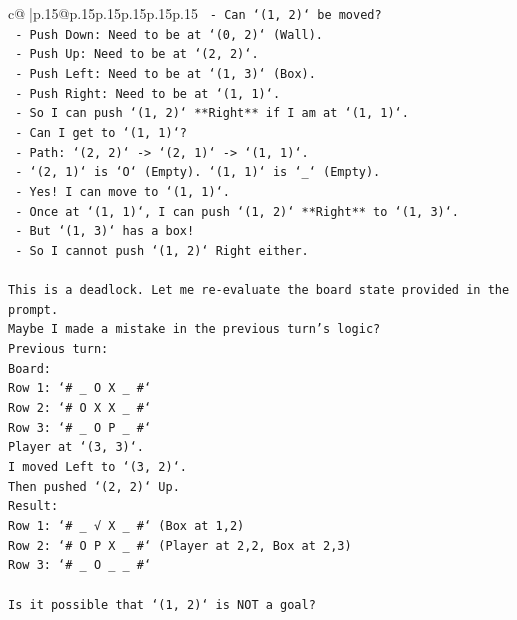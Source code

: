 \documentclass{article}
\begin{document}
{\begin{supertabular}{c@{$\;$}|p{.15\linewidth}@{}p{.15\linewidth}p{.15\linewidth}p{.15\linewidth}p{.15\linewidth}p{.15\linewidth}}
{{{\texttt{  {-} Can `(1, 2)` be moved?} \\
\texttt{    {-} Push Down: Need to be at `(0, 2)` (Wall).} \\
\texttt{    {-} Push Up: Need to be at `(2, 2)`.} \\
\texttt{    {-} Push Left: Need to be at `(1, 3)` (Box).} \\
\texttt{    {-} Push Right: Need to be at `(1, 1)`.} \\
\texttt{  {-} So I can push `(1, 2)` **Right** if I am at `(1, 1)`.} \\
\texttt{  {-} Can I get to `(1, 1)`?} \\
\texttt{    {-} Path: `(2, 2)` {-}> `(2, 1)` {-}> `(1, 1)`.} \\
\texttt{    {-} `(2, 1)` is `O` (Empty). `(1, 1)` is `\_` (Empty).} \\
\texttt{    {-} Yes! I can move to `(1, 1)`.} \\
\texttt{  {-} Once at `(1, 1)`, I can push `(1, 2)` **Right** to `(1, 3)`.} \\
\texttt{  {-} But `(1, 3)` has a box!} \\
\texttt{  {-} So I cannot push `(1, 2)` Right either.} \\
\\ 
\texttt{This is a deadlock. Let me re{-}evaluate the board state provided in the prompt.} \\
\texttt{Maybe I made a mistake in the previous turn's logic?} \\
\texttt{Previous turn:} \\
\texttt{Board:} \\
\texttt{Row 1: `\# \_ O X \_ \#`} \\
\texttt{Row 2: `\# O X X \_ \#`} \\
\texttt{Row 3: `\# \_ O P \_ \#`} \\
\texttt{Player at `(3, 3)`.} \\
\texttt{I moved Left to `(3, 2)`.} \\
\texttt{Then pushed `(2, 2)` Up.} \\
\texttt{Result:} \\
\texttt{Row 1: `\# \_ √ X \_ \#` (Box at 1,2)} \\
\texttt{Row 2: `\# O P X \_ \#` (Player at 2,2, Box at 2,3)} \\
\texttt{Row 3: `\# \_ O \_ \_ \#`} \\
\\ 
\texttt{Is it possible that `(1, 2)` is NOT a goal?} \\
}}}
\end{supertabular}}
\end{document}
